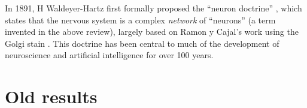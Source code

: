 \documentclass{article}
\newcommand{\mB}{\mathcal{B}}
\newcommand{\mM}{\mathcal{M}}
\newtheorem{defi}{Definition}
\begin{document}
In 1891, H Waldeyer-Hartz first formally proposed the ``neuron doctrine'' \cite{Waldeyer-Hartz1891}, which states that the nervous system is a complex \emph{network} of ``neurons'' (a term invented in the above review), largely based on Ramon y Cajal's work using the Golgi stain \cite{Finger01}.  This doctrine has been central to much of the development of neuroscience and artificial intelligence for over 100 years.  




\section{Old results} %
\label{sec:old_results}

% 
% 
% 
\end{document}
